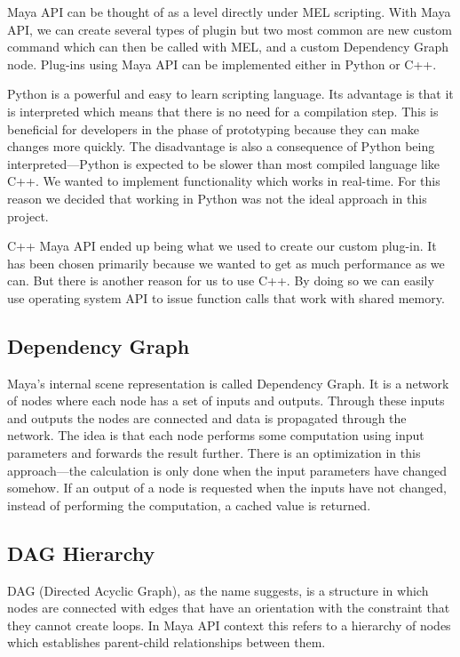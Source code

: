 \documentclass[
  digital, %
  table,   %
  nolof,     %
  nolot,     %
  oneside,
]{fithesis3}
\begin{document}
Maya API can be thought of as a level directly under MEL scripting. With Maya API, we can create several types of plugin but two most common are new custom command which can then be called with MEL, and a custom Dependency Graph node. Plug-ins using Maya API can be implemented either in Python or C++.

Python is a powerful and easy to learn scripting language. Its advantage is that it is interpreted which means that there is no need for a compilation step. This is beneficial for developers in the phase of prototyping because they can make changes more quickly. The disadvantage is also a consequence of Python being interpreted—Python is expected to be slower than most compiled language like C++. We wanted to implement functionality which works in real-time. For this reason we decided that working in Python was not the ideal approach in this project.

C++ Maya API ended up being what we used to create our custom plug-in. It has been chosen primarily because we wanted to get as much performance as we can. But there is another reason for us to use C++. By doing so we can easily use operating system API to issue function calls that work with shared memory.

\subsection{Dependency Graph}
Maya's internal scene representation is called Dependency Graph. It is a network of nodes where each node has a set of inputs and outputs. Through these inputs and outputs the nodes are connected and data is propagated through the network. The idea is that each node performs some computation using input parameters and forwards the result further. There is an optimization in this approach—the calculation is only done when the input parameters have changed somehow. If an output of a node is requested when the inputs have not changed, instead of performing the computation, a cached value is returned.

\subsection{DAG Hierarchy}
DAG (Directed Acyclic Graph), as the name suggests, is a structure in which nodes are connected with edges that have an orientation with the constraint that they cannot create loops. In Maya API context this refers to a hierarchy of nodes which establishes parent-child relationships between them.
\end{document}
